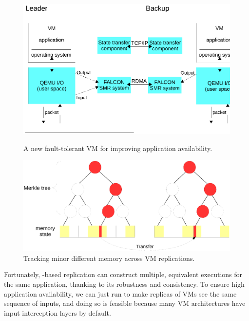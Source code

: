 \begin{figure}[!htb]
    \begin{minipage}{.49\textwidth}
        \vspace{-.2in}
        \includegraphics[width=0.34\textheight]{figures/vm_arch.ps}
        \vspace{-.3in}
        \caption{A new fault-tolerant VM for improving application 
availability.}
        \label{fig:vm-arch}
    \end{minipage}
    \begin{minipage}{0.51\textwidth}
        \vspace{-.2in}
        \includegraphics[width=0.34\textheight]{figures/tree.ps}
        \vspace{-.3in}
        \caption{Tracking minor different memory across VM replications.}
        \label{fig:vm-tree}
    \end{minipage}
\end{figure}




Fortunately, \paxos-based replication can construct multiple, equivalent 
executions for the same application, thanking to its robustness and 
consistency. To ensure high application availability, we can just run \paxos to 
make replicas of VMs see the same sequence of inputs, and doing so is feasible 
because many VM architectures have input interception layers by default.

